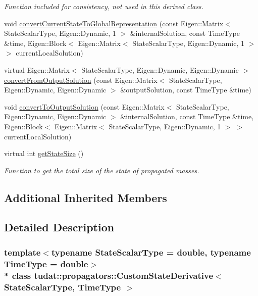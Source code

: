\begin{DoxyCompactItemize}
\begin{DoxyCompactList}\small\item\em Function included for consistency, not used in this derived class. \end{DoxyCompactList}\item 
void \hyperlink{classtudat_1_1propagators_1_1CustomStateDerivative_a0ac8d9b628761a6077cf280d1dbe6b5e}{convert\+Current\+State\+To\+Global\+Representation} (const Eigen\+::\+Matrix$<$ State\+Scalar\+Type, Eigen\+::\+Dynamic, 1 $>$ \&internal\+Solution, const Time\+Type \&time, Eigen\+::\+Block$<$ Eigen\+::\+Matrix$<$ State\+Scalar\+Type, Eigen\+::\+Dynamic, 1 $>$ $>$ current\+Local\+Solution)
\item 
virtual Eigen\+::\+Matrix$<$ State\+Scalar\+Type, Eigen\+::\+Dynamic, Eigen\+::\+Dynamic $>$ \hyperlink{classtudat_1_1propagators_1_1CustomStateDerivative_a6361733845c6c55305f326dbea40f5a1}{convert\+From\+Output\+Solution} (const Eigen\+::\+Matrix$<$ State\+Scalar\+Type, Eigen\+::\+Dynamic, Eigen\+::\+Dynamic $>$ \&output\+Solution, const Time\+Type \&time)
\item 
void \hyperlink{classtudat_1_1propagators_1_1CustomStateDerivative_a22dbfcc73c2922a4368b27841e0471de}{convert\+To\+Output\+Solution} (const Eigen\+::\+Matrix$<$ State\+Scalar\+Type, Eigen\+::\+Dynamic, Eigen\+::\+Dynamic $>$ \&internal\+Solution, const Time\+Type \&time, Eigen\+::\+Block$<$ Eigen\+::\+Matrix$<$ State\+Scalar\+Type, Eigen\+::\+Dynamic, 1 $>$ $>$ current\+Local\+Solution)
\item 
virtual int \hyperlink{classtudat_1_1propagators_1_1CustomStateDerivative_a9f28c0a80802f119d580335825d32f91}{get\+State\+Size} ()
\begin{DoxyCompactList}\small\item\em Function to get the total size of the state of propagated masses. \end{DoxyCompactList}\end{DoxyCompactItemize}
\subsection*{Additional Inherited Members}


\subsection{Detailed Description}
\subsubsection*{template$<$typename State\+Scalar\+Type = double, typename Time\+Type = double$>$\\*
class tudat\+::propagators\+::\+Custom\+State\+Derivative$<$ State\+Scalar\+Type, Time\+Type $>$}

